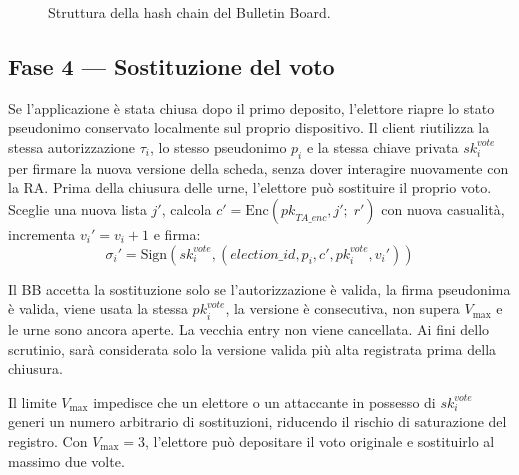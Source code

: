 \documentclass[12pt,a4paper]{article}
\newcommand{\pk}{\mathit{pk}}
\newcommand{\sk}{\mathit{sk}}
\begin{document}
\begin{figure}[h!]
{%
}
\caption{Struttura della hash chain del Bulletin Board.}
\label{fig:hashchain}
\end{figure}

\subsection{Fase 4 --- Sostituzione del voto}
Se l'applicazione \`e stata chiusa dopo il primo deposito, l'elettore
riapre lo stato pseudonimo conservato localmente sul proprio dispositivo.
Il client riutilizza la stessa autorizzazione $\tau_i$, lo stesso
pseudonimo $p_i$ e la stessa chiave privata $\sk_i^{\mathit{vote}}$
per firmare la nuova versione della scheda, senza dover interagire
nuovamente con la RA. Prima della chiusura delle urne, l'elettore pu\`o sostituire il proprio voto. Sceglie una nuova lista $j'$, calcola $c' = \mathrm{Enc}(\pk_{\mathit{TA\_enc}}, j';\; r')$ con nuova casualit\`a, incrementa $v_i' = v_i + 1$ e firma:
\[
\sigma_i' = \mathrm{Sign}(\sk_i^{\mathit{vote}}, (\mathit{election\_id}, p_i, c', \pk_i^{\mathit{vote}}, v_i'))
\]

Il BB accetta la sostituzione solo se l'autorizzazione \`e valida, la firma pseudonima \`e valida, viene usata la stessa $\pk_i^{\mathit{vote}}$, la versione \`e consecutiva, non supera $V_{\max}$ e le urne sono ancora aperte. La vecchia entry non viene cancellata. Ai fini dello scrutinio, sar\`a considerata solo la versione valida pi\`u alta registrata prima della chiusura.

Il limite $V_{\max}$ impedisce che un elettore o un attaccante in possesso di $\sk_i^{\mathit{vote}}$ generi un numero arbitrario di sostituzioni, riducendo il rischio di saturazione del registro. Con $V_{\max} = 3$, l'elettore pu\`o depositare il voto originale e sostituirlo al massimo due volte.
\end{document}
